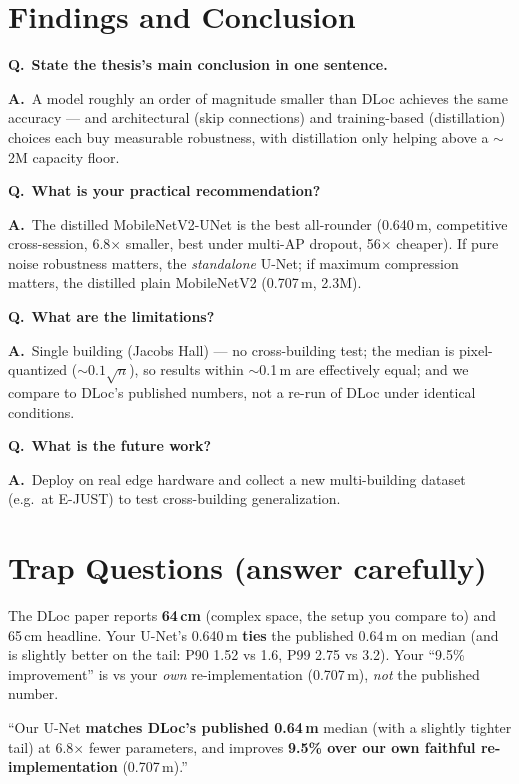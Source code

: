 \documentclass[11pt]{article}
\newcommand{\Q}[1]{\medskip\noindent\textbf{\textcolor{blue!50!black}{Q.}}\ \textbf{#1}\par\nopagebreak}
\newcommand{\A}{\noindent\textbf{A.}\ }
\begin{document}
\section{Findings and Conclusion}

\Q{State the thesis's main conclusion in one sentence.}
\A A model roughly an order of magnitude smaller than DLoc achieves the same accuracy --- and
architectural (skip connections) and training-based (distillation) choices each buy measurable
robustness, with distillation only helping above a $\sim$2M capacity floor.

\Q{What is your practical recommendation?}
\A The distilled MobileNetV2-UNet is the best all-rounder (0.640\,m, competitive cross-session,
6.8$\times$ smaller, best under multi-AP dropout, 56$\times$ cheaper). If pure noise robustness matters,
the \emph{standalone} U-Net; if maximum compression matters, the distilled plain MobileNetV2 (0.707\,m,
2.3M).

\Q{What are the limitations?}
\A Single building (Jacobs Hall) --- no cross-building test; the median is pixel-quantized
($\sim0.1\sqrt{n}$), so results within $\sim$0.1\,m are effectively equal; and we compare to DLoc's
published numbers, not a re-run of DLoc under identical conditions.

\Q{What is the future work?}
\A Deploy on real edge hardware and collect a new multi-building dataset (e.g.\ at E-JUST) to test
cross-building generalization.

\section{Trap Questions (answer carefully)}

\begin{trap}
The DLoc paper reports \textbf{64\,cm} (complex space, the setup you compare to) and 65\,cm headline.
Your U-Net's 0.640\,m \textbf{ties} the published 0.64\,m on median (and is slightly better on the tail:
P90 1.52 vs 1.6, P99 2.75 vs 3.2). Your ``9.5\% improvement'' is vs your \emph{own} re-implementation
(0.707\,m), \emph{not} the published number.
\end{trap}
\begin{safe}
``Our U-Net \textbf{matches DLoc's published 0.64\,m} median (with a slightly tighter tail) at
6.8$\times$ fewer parameters, and improves \textbf{9.5\% over our own faithful re-implementation}
(0.707\,m).''
\end{safe}
\end{document}
